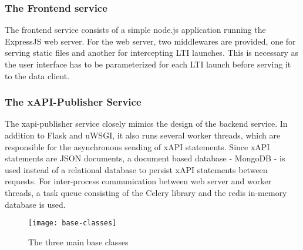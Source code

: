     \subsubsection{The Frontend service}
        The frontend service consists of a simple node.js
        application running the ExpressJS web server. For the
        web server, two middlewares are provided, one for
        serving static files and another for intercepting LTI launches.
        This is necessary as the user interface has to be
        parameterized for each LTI launch before serving it to the data client.

    \subsubsection{The xAPI-Publisher Service}
    \label{implementation:architecture:xapi-publisher}
        The xapi-publisher service closely mimics the design of the
        backend service. In addition to Flask and uWSGI,
        it also runs several worker threads, which are responsible for the
        asynchronous sending of xAPI statements. Since xAPI statements
        are JSON documents, a document based database - MongoDB - is used instead
        of a relational database to persist xAPI statements between requests.
        For inter-process communication between web server and
        worker threads, a task queue consisting of the Celery library
        and the redis in-memory database is used.

        \begin{wrapfigure}{o}{.5\textwidth}
            \centering
            \texttt{[image: base-classes]}
            \caption{The three main base classes}
            \label{fig:base-classes-dia}
        \end{wrapfigure}


